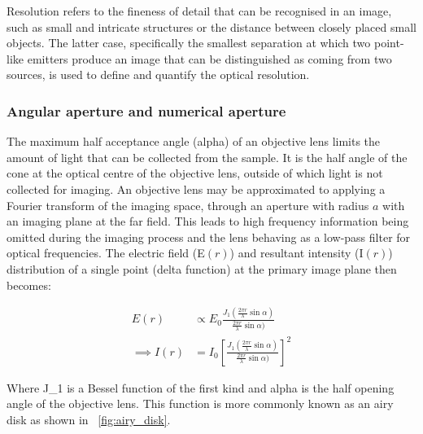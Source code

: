 Resolution refers to the fineness of detail that can be recognised in an image, such as small and intricate structures or the distance between closely placed small objects.
The latter case, specifically the smallest separation at which two point-like emitters produce an image that can be distinguished as coming from two sources, is used to define and quantify the optical resolution.

\subsubsection{Angular aperture and numerical aperture}

The maximum half acceptance angle (\gls{alpha}) of an \gls{objective lens} limits the amount of light that can be collected from the sample.
It is the half angle of the cone at the optical centre of the objective lens, outside of which light is not collected for imaging.
An \gls{objective lens} may be approximated to applying a Fourier transform of the imaging space, through an aperture with radius $a$ with an imaging plane at the far field.
This leads to high frequency information being omitted during the imaging process and the lens behaving as a low-pass filter for optical frequencies.
The electric field (\gls{E}$(r)$) and resultant intensity (\gls{I}$(r)$) distribution of a single point (delta function) at the primary image plane then becomes:

\begin{align}
    E(r) &\propto E_0 \frac{J_1 \left( \frac{2\pi r}{\lambda}\sin \alpha \right)}{ \frac{2\pi r}{\lambda} \sin {\alpha})}\label{eq:E_airy}\\
    \implies
    I(r) &= I_0 \left[\frac{J_1 \left( \frac{2\pi r}{\lambda} \sin \alpha \right)}{ \frac{2\pi r}{\lambda} \sin {\alpha})}\right]^2\label{eq:I_airy}
\end{align}

Where \gls{J_1} is a Bessel function of the first kind and \gls{alpha} is the half opening angle of the objective lens.
This function is more commonly known as an \Gls{airy disk} as shown in \figurename~\ref{fig:airy_disk}.

